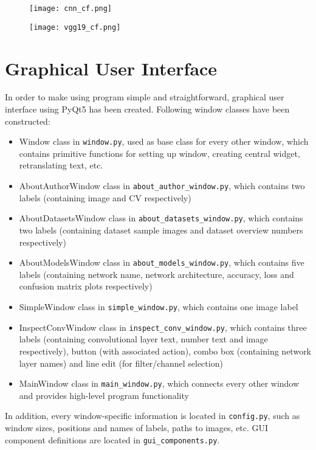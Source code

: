 \begin{figure}[h]
	\centering
	\begin{minipage}{.5\textwidth}
		\centering
		\hspace*{-0.7cm}
		\vspace*{-0.45cm}
		\texttt{[image: cnn\_cf.png]}
		\label{fig:cnncf}
	\end{minipage}%
	\begin{minipage}{.5\textwidth}
		\centering
		\hspace*{-0.7cm}
		\texttt{[image: vgg19\_cf.png]}
		\label{fig:vgg19cf}
	\end{minipage}
\end{figure}

\clearpage

\section{Graphical User Interface} 
\label{gui}

In order to make using program simple and straightforward, graphical user interface using PyQt5 has been created. Following window classes have been constructed:
\begin{itemize}
	\itemsep 0em
	\item Window class in \texttt{window.py}, used as base class for every other window, which contains primitive functions for setting up window, creating central widget, retranslating text, etc.
	\item AboutAuthorWindow class in \texttt{about\_author\_window.py}, which contains two labels (containing image and CV respectively)
	\item AboutDatasetsWindow class in \texttt{about\_datasets\_window.py}, which contains two labels (containing dataset sample images and dataset overview numbers respectively)
	\item AboutModelsWindow class in \texttt{about\_models\_window.py}, which contains five labels (containing network name, network architecture, accuracy, loss and confusion matrix plots respectively)
	\item SimpleWindow class in \texttt{simple\_window.py}, which contains one image label
	\item InspectConvWindow class in \texttt{inspect\_conv\_window.py}, which contains three labels (containing convolutional layer text, number text and image respectively), button (with associated action), combo box (containing network layer names)  and line edit (for filter/channel selection)
	\item MainWindow class in \texttt{main\_window.py}, which connects every other window and provides high-level program functionality 
\end{itemize}
In addition, every window-specific information is located in \texttt{config.py}, such as window sizes, positions and names of labels, paths to images, etc. GUI component definitions are located in \texttt{gui\_components.py}.


